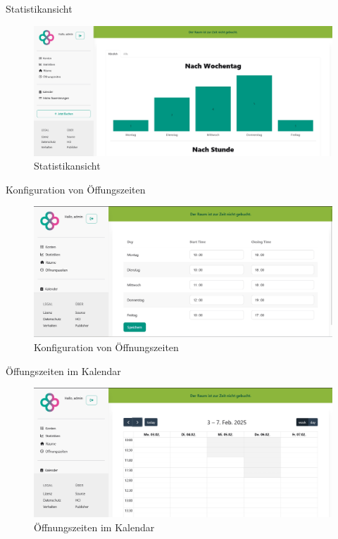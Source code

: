 \documentclass{sdqbeamer}
\begin{document}
\begin{frame}{Statistikansicht}
    \begin{figure}
        \centering
        \includegraphics[width=1\linewidth]{admin_statistics.png}
        \caption{Statistikansicht}
        \label{fig:enter-label}
    \end{figure}
\end{frame}

\begin{frame}{Konfiguration von Öffungszeiten}
    \begin{figure}
        \centering
        \includegraphics[width=1\linewidth]{admin_opening_hours.png}
        \caption{Konfiguration von Öffnungszeiten}
        \label{fig:enter-label}
    \end{figure}
\end{frame}

\begin{frame}{Öffungszeiten im Kalendar}
    \begin{figure}
        \centering
        \includegraphics[width=1\linewidth]{calendar_opening_hours.png}
        \caption{Öffnungszeiten im Kalendar}
        \label{fig:enter-label}
    \end{figure}
\end{frame}
\end{document}
